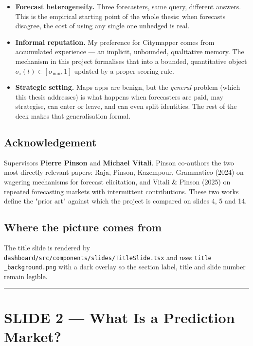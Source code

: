\documentclass[11pt]{article}
\begin{document}
\begin{itemize}
\item \textbf{Forecast heterogeneity.} Three forecasters, same query, different answers. This is the empirical starting point of the whole thesis: when forecasts disagree, the cost of using any single one unhedged is real.
\item \textbf{Informal reputation.} My preference for Citymapper comes from accumulated experience --- an implicit, unbounded, qualitative memory. The mechanism in this project formalises that into a bounded, quantitative object $\sigma_i(t) \in [\sigma_{\min}, 1]$ updated by a proper scoring rule.
\item \textbf{Strategic setting.} Maps apps are benign, but the \emph{general} problem (which this thesis addresses) is what happens when forecasters are paid, may strategise, can enter or leave, and can even split identities. The rest of the deck makes that generalisation formal.
\end{itemize}

\subsection{Acknowledgement}


Supervisors \textbf{Pierre Pinson} and \textbf{Michael Vitali}. Pinson co-authors the two most directly relevant papers: Raja, Pinson, Kazempour, Grammatico (2024) on wagering mechanisms for forecast elicitation, and Vitali \& Pinson (2025) on repeated forecasting markets with intermittent contributions. These two works define the "prior art" against which the project is compared on slides 4, 5 and 14.

\subsection{Where the picture comes from}


The title slide is rendered by \texttt{dashboard/src/components/slides/TitleSlide.tsx} and uses \texttt{title\\_background.png} with a dark overlay so the section label, title and slide number remain legible.

\bigskip\hrule\bigskip

\section{SLIDE 2 --- What Is a Prediction Market?}
\end{document}
